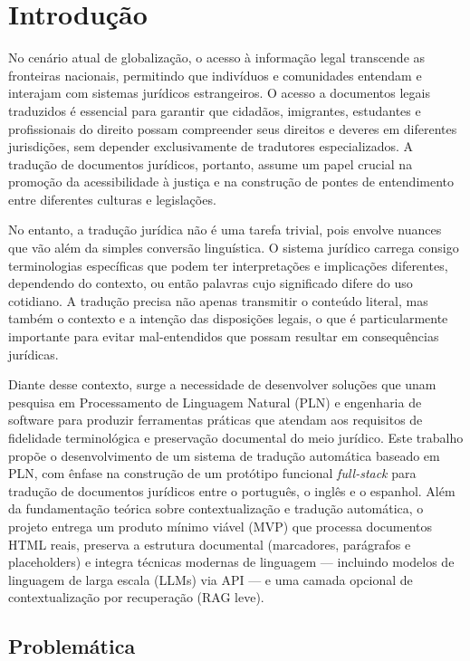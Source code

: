 \chapter{Introdução}

No cenário atual de globalização, o acesso à informação legal transcende as fronteiras nacionais, permitindo que indivíduos e comunidades entendam e interajam com sistemas jurídicos estrangeiros. O acesso a documentos legais traduzidos é essencial para garantir que cidadãos, imigrantes, estudantes e profissionais do direito possam compreender seus direitos e deveres em diferentes jurisdições, sem depender exclusivamente de tradutores especializados. A tradução de documentos jurídicos, portanto, assume um papel crucial na promoção da acessibilidade à justiça e na construção de pontes de entendimento entre diferentes culturas e legislações.

No entanto, a tradução jurídica não é uma tarefa trivial, pois envolve nuances que vão além da simples conversão linguística. O sistema jurídico carrega consigo terminologias específicas que podem ter interpretações e implicações diferentes, dependendo do contexto, ou então palavras cujo significado difere do uso cotidiano. A tradução precisa não apenas transmitir o conteúdo literal, mas também o contexto e a intenção das disposições legais, o que é particularmente importante para evitar mal-entendidos que possam resultar em consequências jurídicas.

Diante desse contexto, surge a necessidade de desenvolver soluções que unam pesquisa em Processamento de Linguagem Natural (PLN) e engenharia de software para produzir ferramentas práticas que atendam aos requisitos de fidelidade terminológica e preservação documental do meio jurídico. Este trabalho propõe o desenvolvimento de um sistema de tradução automática baseado em PLN, com ênfase na construção de um protótipo funcional \textit{full-stack} para tradução de documentos jurídicos entre o português, o inglês e o espanhol. Além da fundamentação teórica sobre contextualização e tradução automática, o projeto entrega um produto mínimo viável (MVP) que processa documentos HTML reais, preserva a estrutura documental (marcadores, parágrafos e placeholders) e integra técnicas modernas de linguagem — incluindo modelos de linguagem de larga escala (LLMs) via API — e uma camada opcional de contextualização por recuperação (RAG leve).

\section{Problemática}

